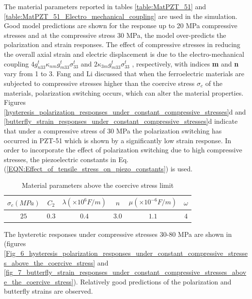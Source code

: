 The material parameters reported in tables \ref{table:MatPZT_51} and \ref{table:MatPZT_51_Electro_mechanical_coupling} are used in the simulation. 
Good model predictions are shown for the response up to 20 MPa compressive stresses and at the compressive stress 30 MPa,
 the model over-predicts the polarization and strain responses. 
 The effect of compressive stresses in reducing the overall axial strain and
 electric displacement is due to the electro-mechanical coupling $4g_{n33}^t{\kappa _{nm}}g_{m33}^t\sigma _{33}^t$ and $2{\kappa _{3m}}g_{m33}^t\sigma _{33}^t$ , respectively, with indices \textbf{m} and \textbf{n} vary from 1 to 3. Fang and Li \cite{Li2004959} discussed that when the ferroelectric materials are subjected to compressive stresses higher than the coercive stress $\sigma _c$ of the materials, polarization switching occurs, which can alter the material properties.
 Figures \ref{hysteresis_polarization_responses_under_constant_compressive_stresses}d and \ref{butterfly_strain_responses_under_constant_compressive_stresses}d indicate that under a compressive stress of 30 MPa the polarization switching has occurred in PZT-51 which is shown by a significantly low strain response.
In order to incorporate the effect of polarization switching due to high compressive stresses, the piezoelectric constants in Eq. (\ref{EQN:Effect_of_tensile_stress_on_piezo_constants}) is used. 
\begin{table}
\caption{Material parameters above the coercive stress limit}
\centering
\begin{tabular}{c c c c c c}
\hline
$\sigma_c (MPa)$ & $C_2$ & $\lambda (\times 10 ^6 F/m)$ & $n$ & $ \mu (\times 10^{-6} F/m) $ & $\omega$ \\ \hline
$25$ & $0.3$ & $0.4$ & $3.0$ & $1.1$ & $4$ \\ \hline
\end{tabular} 
\label{table4:Material_parameters_above_the_coercive_stress_limit}
\end{table}
The hysteretic responses under compressive stresses 30-80 MPa are shown in (figures \ref{Fig_6_hysteresis_polarization_responses_under_constant_compressive_stresses_above_the_coercive_stress} and \ref{fig_7_butterfly_strain_responses_under_constant_compressive_stresses_above_the_coercive_stress}). 
Relatively good predictions of the polarization and butterfly strains are observed.
